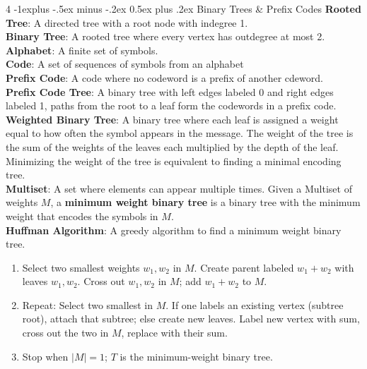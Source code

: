 \documentclass[letterpaper, 8pt]{extarticle}
\makeatletter
\renewcommand{\section}{\@startsection{section}{1}{0mm}%
	{-1explus -.5ex minus -.2ex}%
	{0.5ex plus .2ex}%
	{\normalfont\normalsize\bfseries}}
\makeatother
\begin{document}
\begin{multicols*}{4}
	\section{Binary Trees \& Prefix Codes}
	\textbf{Rooted Tree}: A directed tree with a root node with indegree 1. \\
	\textbf{Binary Tree}: A rooted tree where every vertex has outdegree at most 2. \\
	\textbf{Alphabet}: A finite set of symbols. \\
	\textbf{Code}: A set of sequences of symbols from an alphabet \\
	\textbf{Prefix Code}: A code where no codeword is a prefix of another cdeword. \\
	\textbf{Prefix Code Tree}: A binary tree with left edges labeled 0 and right edges labeled 1, paths from the root to a leaf form the codewords in a prefix code. \\
	\textbf{Weighted Binary Tree}: A binary tree where each leaf is assigned a weight equal to how often the symbol appears in the message. The weight of the tree is the sum of the weights of the leaves each multiplied by the depth of the leaf. Minimizing the weight of the tree is equivalent to finding a minimal encoding tree. \\
	\textbf{Multiset}: A set where elements can appear multiple times. Given a Multiset of weights $M$, a \textbf{minimum weight binary tree} is a binary tree with the minimum weight that encodes the symbols in $M$. \\
	\textbf{Huffman Algorithm}: A greedy algorithm to find a minimum weight binary tree.
	\begin{enumerate}
		\item Select two smallest weights $w_1, w_2$ in $M$. Create parent labeled $w_1 + w_2$ with leaves $w_1, w_2$. Cross out $w_1, w_2$ in $M$; add $w_1 + w_2$ to $M$.
		\item Repeat: Select two smallest in $M$. If one labels an existing vertex (subtree root), attach that subtree; else create new leaves. Label new vertex with sum, cross out the two in $M$, replace with their sum.
		\item Stop when $|M| = 1$; $T$ is the minimum-weight binary tree.
	\end{enumerate}
\end{multicols*}
\end{document}
